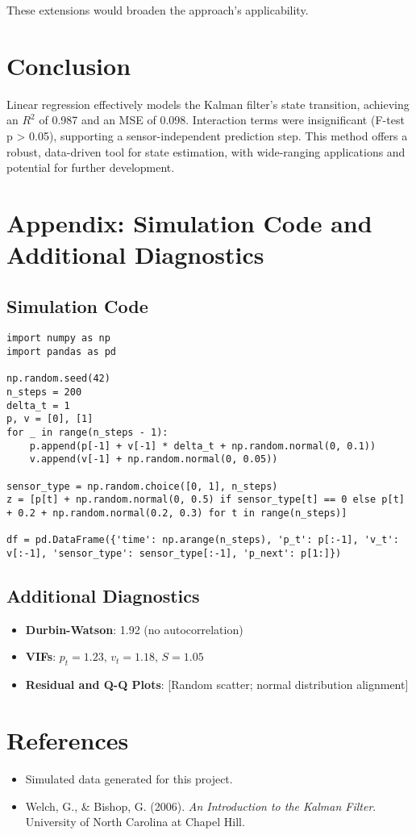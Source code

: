\documentclass[12pt]{article}
\begin{document}
These extensions would broaden the approach’s applicability.

\section{Conclusion}
\label{sec:conclusion}

Linear regression effectively models the Kalman filter’s state transition, achieving an \( R^2 \) of 0.987 and an MSE of 0.098. Interaction terms were insignificant (F-test p > 0.05), supporting a sensor-independent prediction step. This method offers a robust, data-driven tool for state estimation, with wide-ranging applications and potential for further development.

\section{Appendix: Simulation Code and Additional Diagnostics}
\label{sec:appendix}

\subsection{Simulation Code}
\begin{lstlisting}
import numpy as np
import pandas as pd

np.random.seed(42)
n_steps = 200
delta_t = 1
p, v = [0], [1]
for _ in range(n_steps - 1):
    p.append(p[-1] + v[-1] * delta_t + np.random.normal(0, 0.1))
    v.append(v[-1] + np.random.normal(0, 0.05))

sensor_type = np.random.choice([0, 1], n_steps)
z = [p[t] + np.random.normal(0, 0.5) if sensor_type[t] == 0 else p[t] + 0.2 + np.random.normal(0.2, 0.3) for t in range(n_steps)]

df = pd.DataFrame({'time': np.arange(n_steps), 'p_t': p[:-1], 'v_t': v[:-1], 'sensor_type': sensor_type[:-1], 'p_next': p[1:]})
\end{lstlisting}

\subsection{Additional Diagnostics}
\begin{itemize}
    \item \textbf{Durbin-Watson}: 1.92 (no autocorrelation)
    \item \textbf{VIFs}: \( p_t = 1.23 \), \( v_t = 1.18 \), \( S = 1.05 \)
    \item \textbf{Residual and Q-Q Plots}: [Random scatter; normal distribution alignment]
\end{itemize}

\section*{References}
\begin{itemize}
    \item Simulated data generated for this project.
    \item Welch, G., \& Bishop, G. (2006). \textit{An Introduction to the Kalman Filter}. University of North Carolina at Chapel Hill.
\end{itemize}
\end{document}
